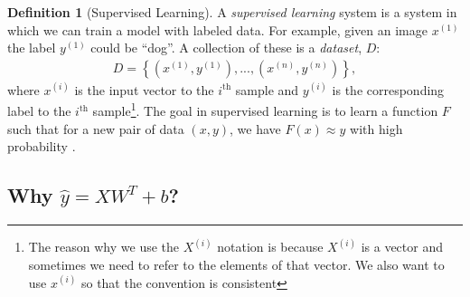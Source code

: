 \documentclass[11pt]{article}
\numberwithin{equation}{section}
\theoremstyle{definition}%
\newtheorem{definition}{Definition}[section]%
\begin{document}
\begin{definition}[Supervised Learning]
A \emph{supervised learning} system is a system in which we can train a model with labeled data. For example, given an image $x^{(1)}$ the label $y^{(1)}$ could be ``dog''. A collection of these is a \emph{dataset}, $D$:
\begin{align}
D= \left\{(x^{(1)}, y^{(1)}), ..., (x^{(n)}, y^{(n)})\right\},
\end{align}
where $x^{(i)}$ is the input vector to the $i^{\text{th}}$ sample and $y^{(i)}$ is the corresponding label to the $i^{\text{th}}$ sample\footnote{The reason why we use the $X^{(i)}$ notation is because $X^{(i)}$ is a vector and sometimes we need to refer to the elements of that vector. We also want to use $x^{(i)}$ so that the convention is consistent}. The goal in supervised learning is to learn a function $F$ such that for a new pair of data $(x, y)$, we have $F(x) \approx y$ with high probability \cite{Cornell}.
\end{definition}

\subsection{Why $\hat{y} = XW^{T} + b$?}
\end{document}
